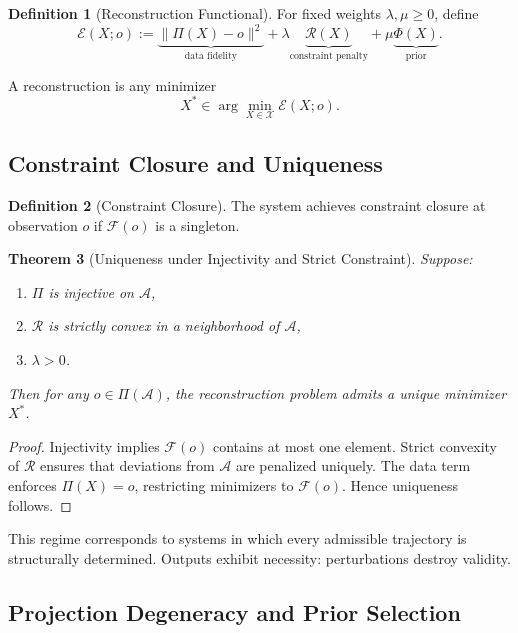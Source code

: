 \documentclass[12pt, oneside]{article}
\theoremstyle{plain}
\newtheorem{theorem}{Theorem}[section]
\theoremstyle{definition}
\newtheorem{definition}[theorem]{Definition}
\theoremstyle{remark}
\begin{document}
\begin{definition}[Reconstruction Functional]
For fixed weights $\lambda, \mu \ge 0$, define
\[
\mathcal{E}(X; o) :=
\underbrace{\|\Pi(X) - o\|^2}_{\text{data fidelity}} 
+ \lambda \underbrace{\mathcal{R}(X)}_{\text{constraint penalty}} 
+ \mu \underbrace{\Phi(X)}_{\text{prior}}.
\]
\end{definition}

A reconstruction is any minimizer
\[
X^* \in \arg\min_{X \in \mathcal{X}} \mathcal{E}(X; o).
\]

\subsection{Constraint Closure and Uniqueness}

\begin{definition}[Constraint Closure]
The system achieves constraint closure at observation $o$ if $\mathcal{F}(o)$ is a singleton.
\end{definition}

\begin{theorem}[Uniqueness under Injectivity and Strict Constraint]
Suppose:
\begin{enumerate}
\item $\Pi$ is injective on $\mathcal{A}$,
\item $\mathcal{R}$ is strictly convex in a neighborhood of $\mathcal{A}$,
\item $\lambda > 0$.
\end{enumerate}
Then for any $o \in \Pi(\mathcal{A})$, the reconstruction problem admits a unique minimizer $X^*$.
\end{theorem}

\begin{proof}
Injectivity implies $\mathcal{F}(o)$ contains at most one element. Strict convexity of $\mathcal{R}$ ensures that deviations from $\mathcal{A}$ are penalized uniquely. The data term enforces $\Pi(X)=o$, restricting minimizers to $\mathcal{F}(o)$. Hence uniqueness follows.
\end{proof}

This regime corresponds to systems in which every admissible trajectory is structurally determined. Outputs exhibit necessity: perturbations destroy validity.

\subsection{Projection Degeneracy and Prior Selection}
\end{document}
